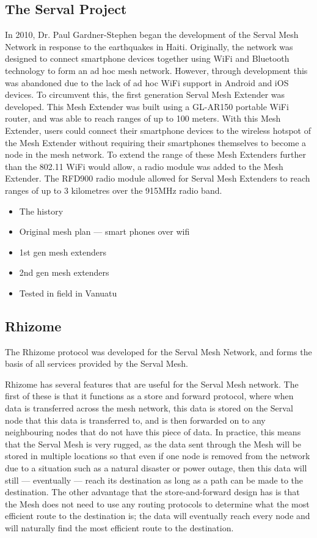 \subsection{The Serval Project}
In 2010, Dr. Paul Gardner-Stephen began the development of the Serval Mesh Network in response to the earthquakes in Haiti. 
Originally, the network was designed to connect smartphone devices together using WiFi and Bluetooth technology to form an ad hoc mesh network.
However, through development this was abandoned due to the lack of ad hoc WiFi support in Android and iOS devices.
To circumvent this, the first generation Serval Mesh Extender was developed.
This Mesh Extender was built using a GL-AR150 portable WiFi router, and was able to reach ranges of up to 100 meters.
With this Mesh Extender, users could connect their smartphone devices to the wireless hotspot of the Mesh Extender without requiring their smartphones themselves to become a node in the mesh network.
To extend the range of these Mesh Extenders further than the 802.11 WiFi would allow, a radio module was added to the Mesh Extender.
The RFD900 radio module allowed for Serval Mesh Extenders to reach ranges of up to 3 kilometres over the 915MHz radio band.



\begin{itemize}
    \item The history
    \item Original mesh plan — smart phones over wifi
    \item 1st gen mesh extenders
    \item 2nd gen mesh extenders
    \item Tested in field in Vanuatu
\end{itemize}


\subsection{Rhizome}
The Rhizome protocol was developed for the Serval Mesh Network, and forms the basis of all services provided by the Serval Mesh.

Rhizome has several features that are useful for the Serval Mesh network.
The first of these is that it functions as a store and forward protocol, where when data is transferred across the mesh network, this data is stored on the Serval node that this data is transferred to, and is then forwarded on to any neighbouring nodes that do not have this piece of data.
In practice, this means that the Serval Mesh is very rugged, as the data sent through the Mesh will be stored in multiple locations so that even if one node is removed from the network due to a situation such as a natural disaster or power outage, then this data will still — eventually — reach its destination as long as a path can be made to the destination.
The other advantage that the store-and-forward design has is that the Mesh does not need to use any routing protocols to determine what the most efficient route to the destination is; the data will eventually reach every node and will naturally find the most efficient route to the destination.

